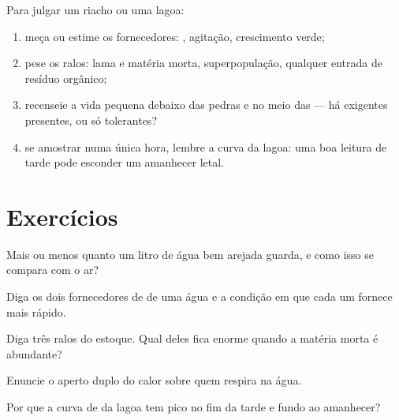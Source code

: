 \begin{method}\label{met:g7:oxygen-in-the-water:judge}
Para julgar um riacho ou uma lagoa:
\begin{enumerate}
  \item meça ou estime os fornecedores: , agitação,
        crescimento verde;
  \item pese os ralos: lama e matéria morta, superpopulação, qualquer
        entrada de resíduo orgânico;
  \item recenseie a vida pequena debaixo das pedras e no meio das
         --- há  exigentes presentes, ou só tolerantes?
  \item se amostrar numa única hora, lembre a curva da lagoa: uma boa
        leitura de tarde pode esconder um amanhecer letal.
\end{enumerate}
\end{method}

\section{Exercícios}

\begin{exercise}[$\star$]\label{exo:g7:oxygen-in-the-water:1}
Mais ou menos quanto  um litro de água bem arejada guarda, e
como isso se compara com o ar?
\end{exercise}

\begin{exercise}[$\star$]\label{exo:g7:oxygen-in-the-water:2}
Diga os dois fornecedores de  de uma água e a condição em que
cada um fornece mais rápido.
\end{exercise}

\begin{exercise}[$\star$]\label{exo:g7:oxygen-in-the-water:3}
Diga três ralos do estoque. Qual deles fica enorme quando a matéria
morta é abundante?
\end{exercise}

\begin{exercise}[$\star$]\label{exo:g7:oxygen-in-the-water:4}
Enuncie o aperto duplo do calor sobre quem respira na água.
\end{exercise}

\begin{exercise}[$\star$]\label{exo:g7:oxygen-in-the-water:5}
Por que a curva de  da lagoa tem pico no fim da tarde e fundo
ao amanhecer?
\end{exercise}

